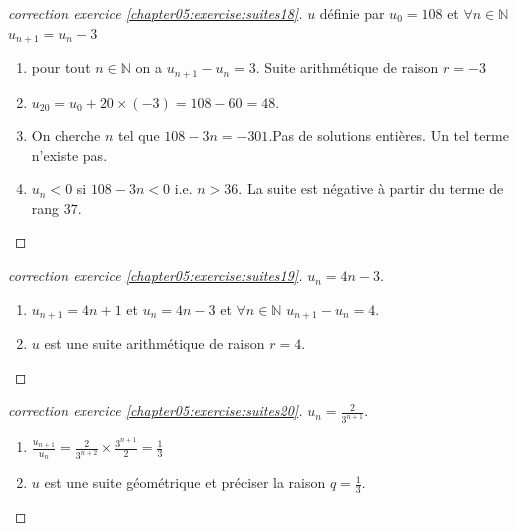 \documentclass[main.tex]{subfiles}
\begin{document}
\begin{proof}[correction exercice \ref{chapter05:exercise:suites18}]    $u$ définie par  $u_0=108$ et $\forall n\in\mathbb{N}$   $u_{n+1}=u_n-3$
	\begin{enumerate}[label=\arabic*),leftmargin=*] 
		\item \colorbox{BurntOrange}{pour tout $n\in\mathbb{N}$ on a $u_{n+1}-u_n=3$. Suite arithmétique de raison $r=-3$}
		\item    \colorbox{BurntOrange}{$u_{20}=u_0+20\times (-3)=108-60=48$}.
		\item  \colorbox{BurntOrange}{On cherche $n$ tel que $108-3n=-301$.Pas de solutions entières. Un tel terme n'existe pas}.
		\item \colorbox{BurntOrange}{$u_n<0$ si $108-3n<0$ i.e. $n>36$. La suite est négative à partir du terme de  rang $37$}.
	\end{enumerate}
\end{proof}
%
%
\begin{proof}[correction exercice \ref{chapter05:exercise:suites19}]   $u_n=4n-3$.  
	\begin{enumerate}[label=\arabic*),leftmargin=*]
		\item   \colorbox{BurntOrange}{$u_{n+1}=4n+1$} et \colorbox{BurntOrange}{$u_n=4n-3$} et     $\forall n\in\mathbb{N}$ $u_{n+1}-u_n=4$.
		\item   $u$ est une suite arithmétique de raison \colorbox{BurntOrange}{$r=4$}. 
	\end{enumerate}
\end{proof}
\begin{proof}[correction exercice \ref{chapter05:exercise:suites20}]  $u_n=\tfrac{2}{3^{n+1}}$.
	\begin{enumerate}[label=\arabic*),leftmargin=*]
		\item   \colorbox{BurntOrange}{$\frac{u_{n+1}}{u_n}=\frac{2}{3^{n+2}}\times \frac{3^ {n+1}}{2}=\frac{1}{3}$}
		\item   $u$ est une suite géométrique et préciser la raison \colorbox{BurntOrange}{$q=\frac{1}{3}$}.
	\end{enumerate} 
\end{proof}
\end{document}
